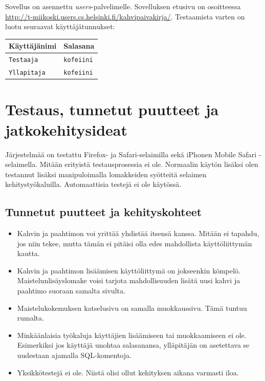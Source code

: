 \documentclass[a4paper,titlepage]{article}
\begin{document}
Sovellus on asennettu \emph{users}-palvelimelle. Sovelluksen etusivu on osoitteessa \url{http://t-miikoski.users.cs.helsinki.fi/kahvipaivakirja/}. Testaamista varten on luotu seuraavat käyttäjätunnukset:

\begin{center}
\begin{tabularx}{\textwidth}{|X|X|}
\hline
Käyttäjänimi & Salasana \\
\hline
\texttt{Testaaja} & \texttt{kofeiini} \\
\texttt{Yllapitaja} & \texttt{kofeiini} \\
\hline
\end{tabularx}
\end{center}


\section{Testaus, tunnetut puutteet ja jatkokehitysideat}

Järjestelmää on testattu Firefox- ja Safari-selaimilla sekä iPhonen
Mobile Safari -selaimella. Mitään erityistä testausprosessia ei
ole. Normaalin käytön lisäksi olen testannut lisäksi manipuloimalla
lomakkeiden syötteitä selaimen kehitystyökaluilla. Automaattisia
testejä ei ole käytössä.

\subsection{Tunnetut puutteet ja kehityskohteet}

\begin{itemize}
\item Kahvin ja paahtimon voi yrittää yhdistää itsensä kanssa. Mitään
  ei tapahdu, jos niin tekee, mutta tämän ei pitäisi olla edes
  mahdollista käyttöliittymän kautta.
\item Kahvin ja paahtimon lisäämisen käyttöliittymä on jokseenkin
  kömpelö. Maistelunlisäyslomake voisi tarjota mahdollisuuden lisätä
  uusi kahvi ja paahtimo suoraan samalta sivulta.
\item Maistelukokemuksen katselusivu on samalla muokkaussivu. Tämä
  tuntuu rumalta.
\item Minkäänlaisia työkaluja käyttäjien lisäämiseen tai muokkaamiseen
  ei ole. Esimerkiksi jos käyttäjä unohtaa salasanansa, ylläpitäjän on
  asetettava se uudestaan ajamalla SQL-komentoja.
\item Yksikkötestejä ei ole. Niistä olisi ollut kehityksen aikana
  varmasti iloa.
\end{itemize}
\end{document}
